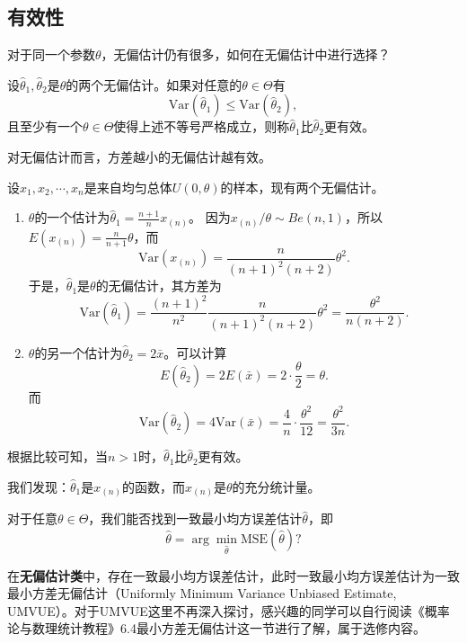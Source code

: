 \subsection{有效性}
\begin{problem}
    对于同一个参数$\theta$，无偏估计仍有很多，如何在无偏估计中进行选择？
\end{problem}
\begin{definition}
    设$\hat{\theta}_1,\hat{\theta}_2$是$\theta$的两个无偏估计。如果对任意的$\theta\in \Theta$有
    $$
    \text{Var}(\hat{\theta}_1) \leq \text{Var}(\hat{\theta}_2),
    $$
    且至少有一个$\theta \in \Theta$使得上述不等号严格成立，则称$\hat{\theta}_1$比$\hat{\theta}_2$更有效。
\end{definition}
\begin{remark}
    对无偏估计而言，方差越小的无偏估计越有效。
\end{remark}
\begin{example}\label{ex:chap20_UE_uniform_distribution}
设$x_1,x_2,\cdots,x_n$是来自均匀总体$U(0,\theta)$的样本，现有两个无偏估计。
\begin{enumerate}
    \item $\theta$的一个估计为$\hat{\theta}_1  = \frac{n+1}{n}x_{(n)}$。 因为$x_{(n)}/\theta\sim Be(n,1)$，所以$E(x_{(n)}) = \frac{n}{n+1}\theta$，而
    $$
    \text{Var}(x_{(n)}) = \frac{n}{(n+1)^2 (n+2)} \theta^2.
    $$
    于是，$\hat{\theta}_1$是$\theta$的无偏估计，其方差为
    $$
    \text{Var}(\hat{\theta}_1) = \frac{(n+1)^2}{n^2} \frac{n}{(n+1)^2 (n+2)} \theta^2 = \frac{\theta^2}{n(n+2)}.$$
    \item $\theta$的另一个估计为$\hat{\theta}_2 = 2\bar{x}$。可以计算
    $$
    E(\hat{\theta}_2) = 2 E(\bar{x}) = 2 \cdot \frac{\theta}{2} = \theta.
    $$
     而
     $$
     \text{Var}(\hat{\theta}_2)= 4 \text{Var}(\bar{x}) = \frac{4}{n} \cdot \frac{\theta^2}{12} = \frac{\theta^2}{3n}.
     $$
\end{enumerate}
根据比较可知，当$n>1$时，$\hat{\theta}_1$比$\hat{\theta}_2$更有效。
\end{example}
\begin{remark}
    我们发现：$\hat{\theta}_1$是$x_{(n)}$的函数，而$x_{(n)}$是$\theta$的充分统计量。
\end{remark}

\begin{problem}
对于任意$\theta \in \Theta$，我们能否找到一致最小均方误差估计$\hat{\theta}$，即
$$
\hat{\theta} = \arg\min_{\hat{\theta}} \text{MSE} (\hat{\theta})?
$$
\end{problem}
\begin{note}
    \vspace{5cm}
\end{note}
\begin{remark}
    在\textbf{无偏估计类}中，存在一致最小均方误差估计，此时一致最小均方误差估计为一致最小方差无偏估计（Uniformly Minimum Variance Unbiased Estimate, UMVUE）。对于UMVUE这里不再深入探讨，感兴趣的同学可以自行阅读《概率论与数理统计教程》6.4最小方差无偏估计这一节进行了解，属于选修内容。
\end{remark}

